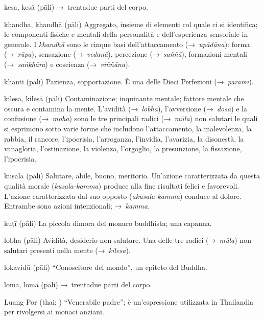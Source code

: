 \begin{glossarydescription}
\item[kesa, kesā] (pāli) →~trentadue parti del corpo.

\item[khandha, khandhā] (pāli) Aggregato, insieme di elementi col quale ci si
  identifica; le componenti fisiche e mentali della personalità e
  dell'esperienza sensoriale in generale. I \emph{khandhā} sono le cinque basi
  dell'attaccamento (→~\emph{upādāna}): forma (→~\emph{rūpa}), sensazione
  (→~\emph{vedanā}), percezione (→~\emph{saññā}), formazioni mentali
  (→~\emph{saṅkhāra}) e coscienza (→~\emph{viññāna}).

\item[khanti] (pāli) Pazienza, sopportazione. È una delle Dieci Perfezioni
  (→~\emph{pāramī}).

\item[kilesa, kilesā] (pāli) Contaminazione; inquinante mentale; fattore mentale
  che oscura e contamina la mente. L'avidità (→~\emph{lobha}), l'avversione
  (→~\emph{dosa}) e la confusione (→~\emph{moha}) sono le tre principali radici
  (→~\emph{mūla}) non salutari le quali si esprimono sotto varie forme che
  includono l'attaccamento, la malevolenza, la rabbia, il rancore, l'ipocrisia,
  l'arroganza, l'invidia, l'avarizia, la disonestà, la vanagloria,
  l'ostinazione, la violenza, l'orgoglio, la presunzione, la fissazione,
  l'ipocrisia.

\item[kusala] (pāli) Salutare, abile, buono, meritorio. Un'azione caratterizzata
  da questa qualità morale (\emph{kusala-kamma}) produce alla fine risultati
  felici e favorevoli. L'azione caratterizzata dal suo opposto
  (\emph{akusala-kamma}) conduce al dolore. Entrambe sono azioni intenzionali;
  →~\emph{kamma}.

\item[kuṭī] (pāli) La piccola dimora del monaco buddhista; una capanna.


\item[lobha] (pāli) Avidità, desiderio non salutare. Una delle tre radici
  (→~\emph{mūla}) non salutari presenti nella mente (→~\emph{kilesa}).

\item[lokavidū] (pāli) ``Conoscitore del mondo'', un epiteto del Buddha.

\item[loma, lomā] (pāli) →~trentadue parti del corpo.

\item[Luang Por] (thai: ) ``Venerabile padre''; è un'espressione
  utilizzata in Thailandia per rivolgersi ai monaci anziani.


\end{glossarydescription}
